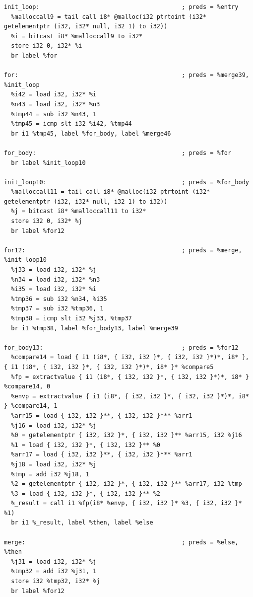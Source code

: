 \documentclass[12pt]{article}
\begin{document}
\begin{mdframed}[hidealllines=true,backgroundcolor=green!10]
\begin{lstlisting}
init_loop:                                        ; preds = %entry
  %malloccall9 = tail call i8* @malloc(i32 ptrtoint (i32* getelementptr (i32, i32* null, i32 1) to i32))
  %i = bitcast i8* %malloccall9 to i32*
  store i32 0, i32* %i
  br label %for

for:                                              ; preds = %merge39, %init_loop
  %i42 = load i32, i32* %i
  %n43 = load i32, i32* %n3
  %tmp44 = sub i32 %n43, 1
  %tmp45 = icmp slt i32 %i42, %tmp44
  br i1 %tmp45, label %for_body, label %merge46

for_body:                                         ; preds = %for
  br label %init_loop10

init_loop10:                                      ; preds = %for_body
  %malloccall11 = tail call i8* @malloc(i32 ptrtoint (i32* getelementptr (i32, i32* null, i32 1) to i32))
  %j = bitcast i8* %malloccall11 to i32*
  store i32 0, i32* %j
  br label %for12

for12:                                            ; preds = %merge, %init_loop10
  %j33 = load i32, i32* %j
  %n34 = load i32, i32* %n3
  %i35 = load i32, i32* %i
  %tmp36 = sub i32 %n34, %i35
  %tmp37 = sub i32 %tmp36, 1
  %tmp38 = icmp slt i32 %j33, %tmp37
  br i1 %tmp38, label %for_body13, label %merge39

for_body13:                                       ; preds = %for12
  %compare14 = load { i1 (i8*, { i32, i32 }*, { i32, i32 }*)*, i8* }, { i1 (i8*, { i32, i32 }*, { i32, i32 }*)*, i8* }* %compare5
  %fp = extractvalue { i1 (i8*, { i32, i32 }*, { i32, i32 }*)*, i8* } %compare14, 0
  %envp = extractvalue { i1 (i8*, { i32, i32 }*, { i32, i32 }*)*, i8* } %compare14, 1
  %arr15 = load { i32, i32 }**, { i32, i32 }*** %arr1
  %j16 = load i32, i32* %j
  %0 = getelementptr { i32, i32 }*, { i32, i32 }** %arr15, i32 %j16
  %1 = load { i32, i32 }*, { i32, i32 }** %0
  %arr17 = load { i32, i32 }**, { i32, i32 }*** %arr1
  %j18 = load i32, i32* %j
  %tmp = add i32 %j18, 1
  %2 = getelementptr { i32, i32 }*, { i32, i32 }** %arr17, i32 %tmp
  %3 = load { i32, i32 }*, { i32, i32 }** %2
  %_result = call i1 %fp(i8* %envp, { i32, i32 }* %3, { i32, i32 }* %1)
  br i1 %_result, label %then, label %else

merge:                                            ; preds = %else, %then
  %j31 = load i32, i32* %j
  %tmp32 = add i32 %j31, 1
  store i32 %tmp32, i32* %j
  br label %for12


\end{lstlisting}
\end{mdframed}
\end{document}
